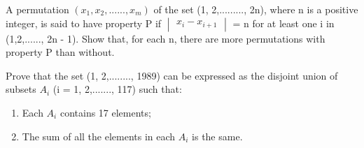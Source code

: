 \item A permutation $(x_1, x_2,......, x_m)$ of the set (1, 2,........., 2n), where n is a positive integer, is said to have property P if $\begin{vmatrix} x_i - x_{i+1} \end{vmatrix}$ = n for at least one i in (1,2,......, 2n - 1). Show that, for each n, there are more permutations with property P than without.

\item Prove that the set (1, 2,........, 1989) can be expressed as the disjoint union of subsets $A_i$ (i = 1, 2,......., 117) such that:
\begin{enumerate}
\item Each $A_i$ contains 17 elements;
\item The sum of all the elements in each $A_i$ is the same.
\end{enumerate}







